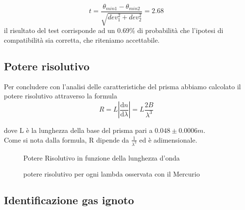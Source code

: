 \documentclass[a4paper]{article}
\theoremstyle{definition}
\begin{document}
\[ t = \frac{\theta_{min1}-\theta_{min2}}{\sqrt{dev_{1}^{2}+ dev_{2}^{2} }} = 2.68 \]
il risultato del test corrisponde ad un 0.69\% di probabilità che l'ipotesi di compatibilità sia corretta, che riteniamo accettabile.

\pagebreak
\subsection{Potere risolutivo}
Per concludere con l'analisi delle caratteristiche del prisma abbiamo calcolato il potere risolutivo attraverso la formula \[ R = L\left | \frac{\mathrm{d} n}{\mathrm{d} \lambda} \right | = L \frac{2B}{\lambda^{3}}\]

dove L è la lunghezza della base del prisma pari a \(0.048 \pm 0.0006m\).\\
Come si nota dalla formula, R dipende da \(\frac{1}{\lambda^{3}}\) ed è adimensionale.

\begin{figure}[!ht]
    	\captionsetup{labelformat=empty}
        \caption{Potere Risolutivo in funzione della lunghezza d'onda}
\end{figure}

\begin{figure}[!htbp]
\captionsetup{labelformat=empty}
    \caption{potere risolutivo per ogni lambda osservata con il Mercurio}
\end{figure}


\pagebreak
\subsection{Identificazione gas ignoto}
\end{document}
